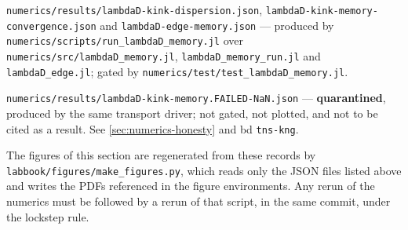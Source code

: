 \texttt{numerics/\allowbreak{}results/\allowbreak{}lambdaD-\allowbreak{}kink-\allowbreak{}dispersion.json},
\texttt{lambdaD-\allowbreak{}kink-\allowbreak{}memory-\allowbreak{}convergence.json} and
\texttt{lambdaD-\allowbreak{}edge-\allowbreak{}memory.json} --- produced by
\texttt{numerics/\allowbreak{}scripts/\allowbreak{}run\_\allowbreak{}lambdaD\_\allowbreak{}memory.jl} over
\texttt{numerics/\allowbreak{}src/\allowbreak{}lambdaD\_\allowbreak{}memory.jl},
\texttt{lambdaD\_\allowbreak{}memory\_\allowbreak{}run.jl} and \texttt{lambdaD\_\allowbreak{}edge.jl}; gated by
\texttt{numerics/\allowbreak{}test/\allowbreak{}test\_\allowbreak{}lambdaD\_\allowbreak{}memory.jl}.

\texttt{numerics/\allowbreak{}results/\allowbreak{}lambdaD-\allowbreak{}kink-\allowbreak{}memory.FAILED-\allowbreak{}NaN.json} ---
\textbf{quarantined}, produced by the same transport driver; not gated, not
plotted, and not to be cited as a result. See
\cref{sec:numerics-honesty} and bd \texttt{tns-kng}.

The figures of this section are regenerated from these records by
\texttt{labbook/\allowbreak{}figures/\allowbreak{}make\_\allowbreak{}figures.py}, which reads only the JSON files
listed above and writes the PDFs referenced in the figure environments. Any
rerun of the numerics must be followed by a rerun of that script, in the same
commit, under the lockstep rule.
\endgroup

\endgroup
